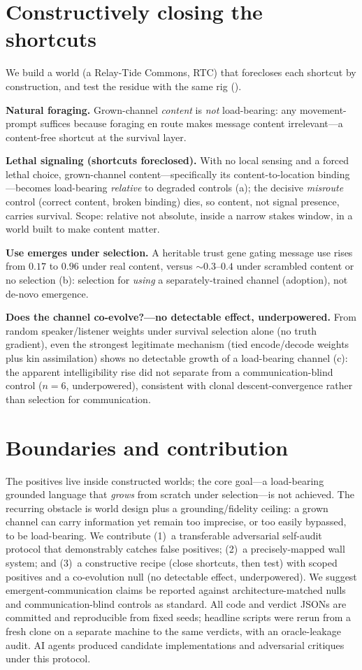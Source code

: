 \documentclass[letterpaper]{article}
\begin{document}
\section{Constructively closing the shortcuts}
We build a world (a Relay-Tide Commons, RTC) that forecloses each shortcut by
construction, and test the residue with the same rig ().

\textbf{Natural foraging.} Grown-channel \emph{content} is \emph{not}
load-bearing: any movement-prompt suffices because foraging en route makes
message content irrelevant---a content-free shortcut at the survival layer.

\textbf{Lethal signaling (shortcuts foreclosed).} With no local sensing and a
forced lethal choice, grown-channel content---specifically its
content-to-location binding---becomes load-bearing \emph{relative} to degraded
controls (a); the decisive \emph{misroute} control (correct content,
broken binding) dies, so content, not signal presence, carries survival. Scope:
relative not absolute, inside a narrow stakes window, in a world built to make
content matter.

\textbf{Use emerges under selection.} A heritable trust gene gating message use
rises from $0.17$ to $0.96$ under real content, versus ${\sim}0.3$--$0.4$ under
scrambled content or no selection (b): selection for \emph{using} a
separately-trained channel (adoption), not de-novo emergence.

\textbf{Does the channel co-evolve?---no detectable effect, underpowered.} From
random speaker/listener weights under survival selection alone (no truth gradient),
even the strongest legitimate mechanism (tied encode/decode weights plus kin
assimilation) shows no detectable growth of a load-bearing channel
(c): the apparent intelligibility rise did not separate from a
communication-blind control ($n{=}6$, underpowered), consistent with clonal
descent-convergence rather than selection for communication.

\section{Boundaries and contribution}
The positives live inside constructed worlds; the core goal---a load-bearing
grounded language that \emph{grows} from scratch under selection---is not
achieved. The recurring obstacle is world design plus a grounding/fidelity
ceiling: a grown channel can carry information yet remain too imprecise, or too
easily bypassed, to be load-bearing. We contribute (1)~a transferable adversarial
self-audit protocol that demonstrably catches false positives; (2)~a
precisely-mapped wall system; and (3)~a constructive recipe (close shortcuts, then
test) with scoped positives and a co-evolution null (no detectable effect,
underpowered). We suggest
emergent-communication claims be reported against architecture-matched nulls and
communication-blind controls as standard. All code and verdict JSONs are committed
and reproducible from fixed seeds; headline scripts were rerun from a fresh clone
on a separate machine to the same verdicts, with an oracle-leakage audit. AI agents
produced candidate implementations and adversarial critiques under this protocol.
\end{document}
